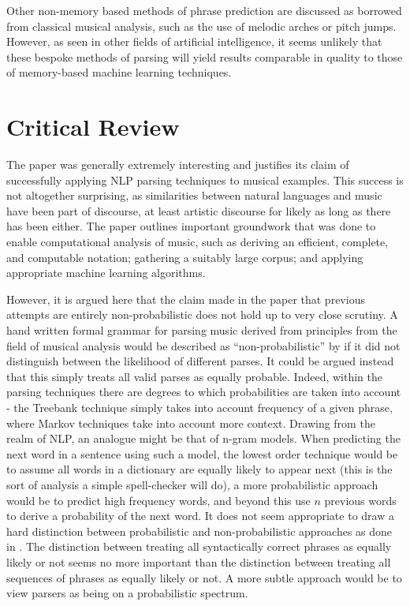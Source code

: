 \documentclass[a4paper,12pt]{article}
\begin{document}
Other non-memory based methods of phrase prediction are discussed as borrowed from classical musical analysis, such as the use of melodic arches or pitch jumps. However, as seen in other fields of artificial intelligence, it seems unlikely that these bespoke methods of parsing will yield results comparable in quality to those of memory-based machine learning techniques.

\section{Critical Review}

The paper was generally extremely interesting and justifies its claim of successfully applying NLP parsing techniques to musical examples. This success is not altogether surprising, as similarities between natural languages and music have been part of discourse, at least artistic discourse for likely as long as there has been either. The paper outlines important groundwork that was done to enable computational analysis of music, such as deriving an efficient, complete, and computable notation; gathering a suitably large corpus; and applying appropriate machine learning algorithms.

However, it is argued here that the claim made in the paper that previous attempts are entirely non-probabilistic does not hold up to very close scrutiny. A hand written formal grammar for parsing music derived from principles from the field of musical analysis would be described as ``non-probabilistic'' by \cite{Bod_probabilisticgrammars} if it did not distinguish between the likelihood of different parses. It could be argued instead that this simply treats all valid parses as equally probable. Indeed, within the parsing techniques there are degrees to which probabilities are taken into account - the Treebank technique simply takes into account frequency of a given phrase, where Markov techniques take into account more context. Drawing from the realm of NLP, an analogue might be that of n-gram models. When predicting the next word in a sentence using such a model, the lowest order technique would be to assume all words in a dictionary are equally likely to appear next (this is the sort of analysis a simple spell-checker will do), a more probabilistic approach would be to predict high frequency words, and beyond this use $n$ previous words to derive a probability of the next word. It does not seem appropriate to draw a hard distinction between probabilistic and non-probabilistic approaches as done in \cite{Bod_probabilisticgrammars}. The distinction between treating all syntactically correct phrases as equally likely or not seems no more important than the distinction between treating all sequences of phrases as equally likely or not. A more subtle approach would be to view parsers as being on a probabilistic spectrum.
\end{document}

